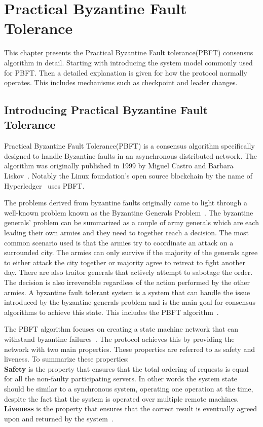 \chapter{Practical Byzantine Fault Tolerance}
\label{chapter:PBFT}
This chapter presents the Practical Byzantine Fault tolerance(PBFT) consensus algorithm in detail.
Starting with introducing the system model commonly used for PBFT. Then a detailed explanation is given for how the protocol normally operates. This includes mechanisms such as checkpoint and leader changes.

\section{Introducing Practical Byzantine Fault Tolerance}
Practical Byzantine Fault Tolerance(PBFT) is a consensus algorithm specifically designed to handle Byzantine faults in an asynchronous distributed network. The algorithm was originally published in 1999 by Miguel Castro and Barbara Liskov~\cite{PAPER:OGPBFT}.
Notably the Linux foundation's open source blockchain by the name of Hyperledger~\cite{WEB:PBFTGeeks, SLIDES:PBFT} uses PBFT.

The problems derived from byzantine faults originally came to light through a well-known problem known as the Byzantine Generals Problem~\cites{WEB:BFTInfo}{ART:lamportByzGenProb}[p.~240-253]{BOOK:BuildDepDistSyst}.
The byzantine generals' problem can be summarized as a couple of army generals which are each leading their own armies and they need to together reach a decision. The most common scenario used is  that the armies try to coordinate an attack on a surrounded city. The armies can only survive if the majority of the generals agree to either attack the city together or majority agree to retreat to fight another day. There are also traitor generals that actively attempt to sabotage the order. The decision is also irreversible regardless of the action performed by the other armies. A byzantine fault tolerant system is a system that can handle the issue introduced by the byzantine generals problem and is the main goal for consensus algorithms to achieve this state. This includes the PBFT algorithm~\cite{WEB:BFTInfo, ART:lamportByzGenProb}.

The PBFT algorithm focuses on creating a state machine network that can withstand byzantine failures~\cite[p.~456]{BOOK:MVstandver3}. The protocol achieves this by providing the network with two main properties. These properties are referred to as safety and liveness.
To summarize these properties:\\
\textbf{Safety} is the property that ensures that the total ordering of requests is equal for all the non-faulty participating servers. In other words the system state should be similar to a synchronous system, operating one operation at the time, despite the fact that the system is operated over multiple remote machines.\\
\textbf{Liveness} is the property that ensures that the correct result is eventually agreed upon and returned by the system~\cites[p.~456]{BOOK:MVstandver3}{WEB:ConsesAlgo}[p.~2]{PAPER:OGPBFT}{SLIDES:PBFT}[p.~403]{PAPER:PBFTRecovery}[p.~257]{BOOK:BuildDepDistSyst}.

